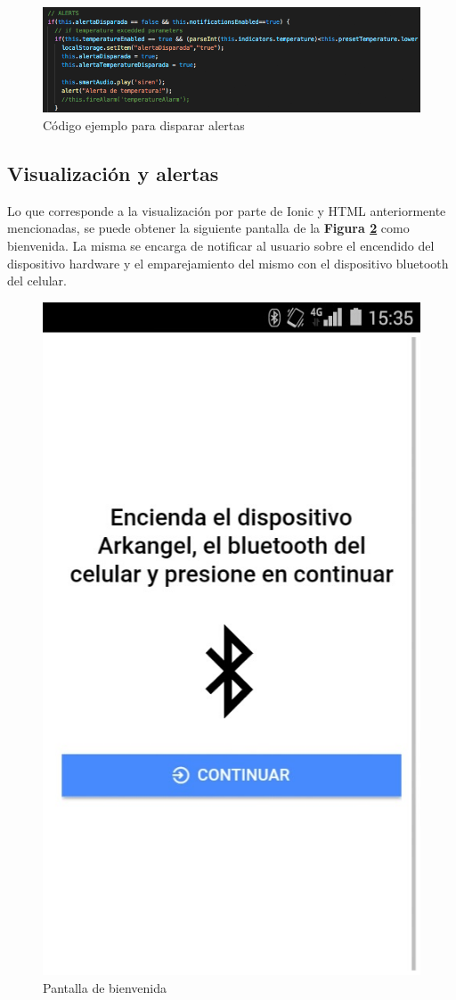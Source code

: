 \documentclass{IEEEtran}
\begin{document}
			\begin{figure}
				\centering
				\includegraphics[width=1\linewidth]{codigo-app-2}
				\caption{Código ejemplo para disparar alertas}
				\label{codigo-app-2}
			\end{figure}

		\subsection{Visualización y alertas}

			Lo que corresponde a la visualización por parte de Ionic y HTML anteriormente mencionadas, se puede obtener la siguiente pantalla de la \textbf{Figura \ref{app-bienvenida}} como bienvenida. La misma se encarga de notificar al usuario sobre el encendido del dispositivo hardware y el emparejamiento del mismo con el dispositivo bluetooth del celular.

			\begin{figure}
				\centering
				\includegraphics[width=0.5\linewidth]{app-bienvenida}
				\caption{Pantalla de bienvenida}
				\label{app-bienvenida}
			\end{figure}
\end{document}
